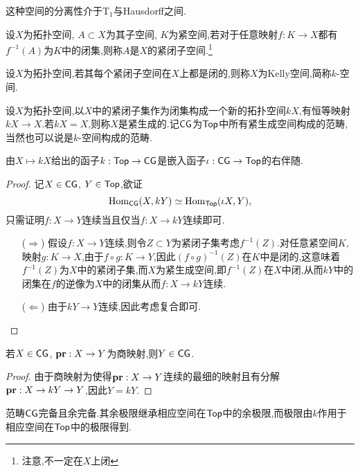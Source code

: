 这种空间的分离性介于T$_1$与Hausdorff之间.
\begin{definition}[紧闭子空间]\label{定义:紧闭子空间}
    设$X$为拓扑空间, $A \subset X$为其子空间, $K$为紧空间,若对于任意映射$f : K \to X$都有$f^{-1}(A)$为$K$中的闭集,则称$A$是$X$的紧闭子空间.\footnote{注意,不一定在$X$上闭}
\end{definition}
\begin{definition}[Kelly空间]
    设$X$为拓扑空间,若其每个紧闭子空间在$X$上都是闭的,则称$X$为Kelly空间,简称$k$-空间.
\end{definition}
\begin{definition}[紧生成空间]\label{定义:紧生成空间}
    设$X$为拓扑空间,以$X$中的紧闭子集作为闭集构成一个新的拓扑空间$kX$,有恒等映射$kX \to X$.若$kX = X$,则称$X$是紧生成的.记$\mathsf{CG}$为$\mathsf{Top}$中所有紧生成空间构成的范畴,当然也可以说是$k$-空间构成的范畴.
\end{definition}
\begin{proposition}\label{命题:紧生成化与嵌入函子伴随}
    由$X \mapsto kX$给出的函子$k : \mathsf{Top} \to \mathsf{CG}$是嵌入函子$\iota: \mathsf{CG} \to \mathsf{Top}$的右伴随.
\end{proposition}
\begin{proof}
    记$X \in \mathsf{CG}$, $Y\in \mathsf{Top}$,欲证
    \[
    \operatorname{Hom}_{\mathsf{CG}}(X,kY)\simeq \operatorname{Hom}_{\mathsf{Top}}(\iota X,Y),
    \]
    只需证明$f : X \to Y$连续当且仅当$f : X \to kY$连续即可.
    \begin{enumerate}
        \item[($\Rightarrow$)]假设$f: X\to Y$连续,则令$Z \subset Y$为紧闭子集考虑$f^{-1}(Z)$.对任意紧空间$K$,映射$g: K \to X$,由于$f\circ g : K \to Y$,因此$(f\circ g)^{-1}(Z)$在$K$中是闭的,这意味着$f^{-1}(Z)$为$X$中的紧闭子集,而$X$为紧生成空间,即$f^{-1}(Z)$在$X$中闭,从而$kY$中的闭集在$f$的逆像为$X$中的闭集从而$f: X \to kY$连续.
        \item[($\Leftarrow$)]由于$kY \to Y$连续,因此考虑复合即可.
    \end{enumerate}
\end{proof}
\begin{proposition}\label{Pro:紧生成空间商映射}
    若$X \in \mathsf{CG}$, $\mathbf{pr}: X\to Y$为商映射,则$Y\in \mathsf{CG}$.
\end{proposition}
\begin{proof}
    由于商映射为使得$\mathbf{pr} : X \to Y$连续的最细的映射且有分解$\mathbf{pr} : X \to kY \to Y$,因此$Y = kY$.
\end{proof}
\begin{theorem}
    范畴$\mathsf{CG}$完备且余完备.其余极限继承相应空间在$\mathsf{Top}$中的余极限,而极限由$k$作用于相应空间在$\mathsf{Top}$中的极限得到.
\end{theorem}
